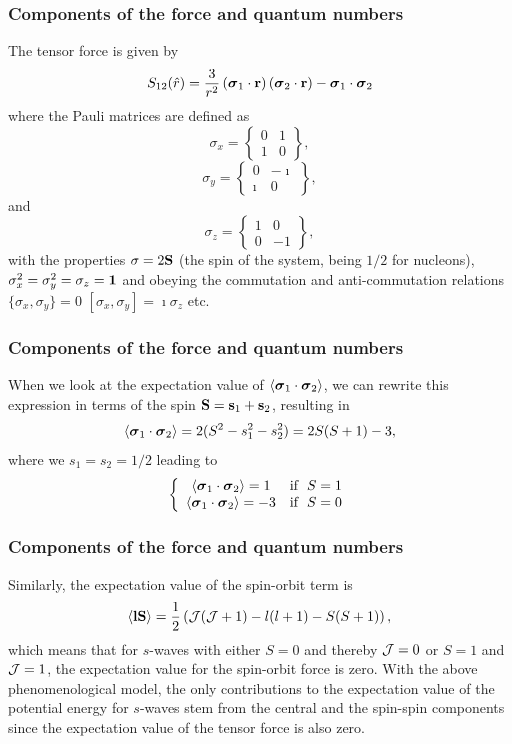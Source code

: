 \documentclass[compress]{beamer}
\begin{document}
\frame
{
\frametitle{Components of the force and quantum numbers}
\begin{small}
{\scriptsize
The tensor force is given by
\[
S_{12} (\hat r) = \frac{3}{r^2}\left(\mbox{\boldmath $\sigma$}_1\cdot {\bf r}\right) \left(\mbox{\boldmath $\sigma$}_2\cdot {\bf r}\right) -\mbox{\boldmath $\sigma$}_1\cdot\mbox{\boldmath $\sigma$}_2\]
where the Pauli matrices are defined as
\[
\sigma_x =\begin{Bmatrix} 0 & 1 \\ 1 & 0 \end{Bmatrix},
\]
\[
\sigma_y =\begin{Bmatrix} 0 & -\imath \\ \imath & 0 \end{Bmatrix},
\]
and
\[
\sigma_z =\begin{Bmatrix} 1 & 0 \\ 0 & -1 \end{Bmatrix},
\]
with the properties $\sigma = 2{\bf S}$ (the spin of the system, being $1/2$ for nucleons), 
$\sigma^2_x=\sigma^2_y=\sigma_z={\bf 1}$ and
obeying the commutation and anti-commutation relations $\{\sigma_x,\sigma_y\} =0$
$[\sigma_x,\sigma_y] =\imath\sigma_z$ etc.
}
\end{small}

} 
\frame
{
\frametitle{Components of the force and quantum numbers}
\begin{small}
{\scriptsize
When we look at the expectation value of 
$\langle \mbox{\boldmath $\sigma$}_1\cdot\mbox{\boldmath $\sigma$}_2\rangle$, we can rewrite this expression in terms of the
spin ${\bf S}={\bf s}_1+{\bf s}_2$, resulting in 
\[
\langle\mbox{\boldmath $\sigma$}_1\cdot\mbox{\boldmath $\sigma$}_2\rangle=2(S^2-s_1^2-s_2^2)=2S(S+1)-3,
\]
where we $s_1=s_2=1/2$ leading to
\[
\left\{ \begin{array}{cc} \langle\mbox{\boldmath $\sigma$}_1\cdot\mbox{\boldmath $\sigma$}_2\rangle=1 &  \mathrm{if} \hspace{0.2cm} S=1\\
\langle\mbox{\boldmath $\sigma$}_1\cdot\mbox{\boldmath $\sigma$}_2\rangle=-3 & \mathrm{if} \hspace{0.2cm} S=0\\\end{array}\right.
\]
}
\end{small}

} 
\frame
{
\frametitle{Components of the force and quantum numbers}
\begin{small}
{\scriptsize
Similarly, the expectation value of the spin-orbit term is 
\[
\langle {\bf l}{\bf S} \rangle = \frac{1}{2}\left( {\cal J}({\cal J}+1)-l(l+1)-S(S+1)\right),
\]
which means that for $s$-waves with either $S=0$ and thereby ${\cal  J}=0$ or $S=1$ and ${\cal J}=1$, 
the expectation value for the
spin-orbit force is zero. With the above phenomenological model, the
only contributions to the expectation value of the potential energy for $s$-waves
stem  from the central and the spin-spin components since the
expectation value of the tensor force is also zero.
}
\end{small}

} 
\end{document}
